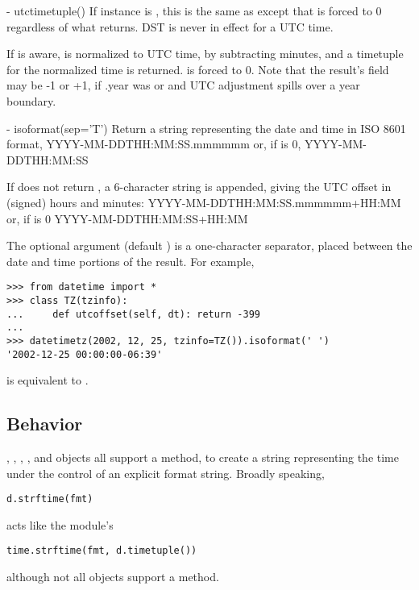   - utctimetuple()
    If  instance  is \naive, this is the same as
     except that  is forced to 0
    regardless of what  returns.  DST is never in effect
    for a UTC time.

    If  is aware,  is normalized to UTC time, by subtracting
     minutes, and a timetuple for the
    normalized time is returned.   is forced to 0.
    Note that the result's  field may be
    -1 or +1, if .year was
     or  and UTC adjustment spills over a
    year boundary.

  - isoformat(sep='T')
    Return a string representing the date and time in ISO 8601 format,
        YYYY-MM-DDTHH:MM:SS.mmmmmm
    or, if  is 0,
        YYYY-MM-DDTHH:MM:SS

    If  does not return , a 6-character
    string is appended, giving the UTC offset in (signed) hours and
    minutes:
        YYYY-MM-DDTHH:MM:SS.mmmmmm+HH:MM
    or, if  is 0
        YYYY-MM-DDTHH:MM:SS+HH:MM

    The optional argument  (default ) is a
    one-character separator, placed between the date and time portions
    of the result.  For example,

\begin{verbatim}
>>> from datetime import *
>>> class TZ(tzinfo):
...     def utcoffset(self, dt): return -399
...
>>> datetimetz(2002, 12, 25, tzinfo=TZ()).isoformat(' ')
'2002-12-25 00:00:00-06:39'
\end{verbatim}

 is equivalent to .


\subsection{ Behavior}

, , , ,
and  objects all support a 
method, to create a string representing the time under the control of
an explicit format string.  Broadly speaking,
\begin{verbatim}
d.strftime(fmt)
\end{verbatim}
acts like the  module's
\begin{verbatim}
time.strftime(fmt, d.timetuple())
\end{verbatim}
although not all objects support a  method.

